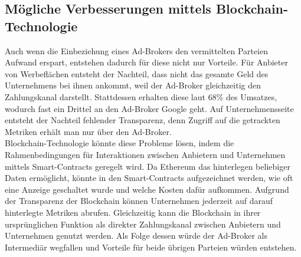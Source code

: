 \subsection{Mögliche Verbesserungen mittels Blockchain-Technologie}
Auch wenn die Einbeziehung eines Ad-Brokers den vermittelten Parteien Aufwand erspart, entstehen dadurch für diese nicht nur Vorteile. 
Für Anbieter von Werbeflächen entsteht der Nachteil, dass nicht das gesamte Geld des Unternehmens bei ihnen ankommt, weil der Ad-Broker gleichzeitig den Zahlungskanal darstellt. 
Stattdessen erhalten diese laut \cite{google_adsense_2021} 68\% des Umsatzes, wodurch fast ein Drittel an den Ad-Broker Google geht. Auf Unternehmensseite entsteht der Nachteil fehlender Transparenz, denn Zugriff auf die getrackten Metriken erhält man nur über den Ad-Broker.\\
Blockchain-Technologie könnte diese Probleme lösen, indem die Rahmenbedingungen für Interaktionen zwischen Anbietern und Unternehmen mittels Smart-Contracts geregelt wird. 
Da Ethereum das hinterlegen beliebiger Daten ermöglicht, könnte in den Smart-Contracts aufgezeichnet werden, wie oft eine Anzeige geschaltet wurde und welche Kosten dafür aufkommen. 
Aufgrund der Transparenz der Blockchain können Unternehmen jederzeit auf darauf hinterlegte Metriken abrufen. Gleichzeitig kann die Blockchain in ihrer ursprünglichen Funktion als direkter Zahlungskanal zwischen Anbietern und Unternehmen genutzt werden. Als Folge dessen würde der Ad-Broker als Intermediär wegfallen und Vorteile für beide übrigen Parteien würden entstehen.
